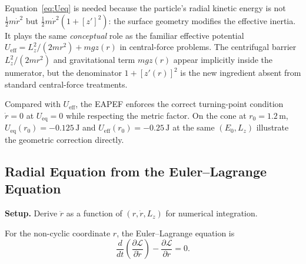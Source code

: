 \documentclass[11pt,letterpaper]{article}
\newcommand{\parhead}[1]{\par\medskip\noindent\textbf{#1}\ignorespaces}
\begin{document}
\begin{summarybox}
Equation~\eqref{eq:Ueq} is needed because the particle's radial kinetic energy is not $\tfrac{1}{2}m\dot{r}^2$ but $\tfrac{1}{2}m\dot{r}^2(1+[z']^2)$: the surface geometry modifies the effective inertia. It plays the same \emph{conceptual} role as the familiar effective potential $U_{\mathrm{eff}}=L_z^2/(2mr^2)+mgz(r)$ in central-force problems. The centrifugal barrier $L_z^2/(2mr^2)$ and gravitational term $mgz(r)$ appear implicitly inside the numerator, but the denominator $1+[z'(r)]^2$ is the new ingredient absent from standard central-force treatments.

Compared with $U_{\mathrm{eff}}$, the EAPEF enforces the correct turning-point condition $\dot{r}=0$ at $U_{\mathrm{eq}}=0$ while respecting the metric factor. On the cone at $r_0=1.2\,\mathrm{m}$, $U_{\mathrm{eq}}(r_0)=-0.125\,\mathrm{J}$ and $U_{\mathrm{eff}}(r_0)=-0.25\,\mathrm{J}$ at the same $(E_0,L_z)$ illustrate the geometric correction directly.
\end{summarybox}

\subsection{Radial Equation from the Euler--Lagrange Equation}
\label{sec:EL}

\parhead{Setup.}
Derive $\ddot{r}$ as a function of $(r,\dot{r},L_z)$ for numerical integration.

For the non-cyclic coordinate $r$, the Euler--Lagrange equation is
\begin{equation}\label{eq:EL}
    \frac{d}{dt}\left(\frac{\partial\mathcal{L}}{\partial\dot{r}}\right)
    - \frac{\partial\mathcal{L}}{\partial r} = 0.
\end{equation}
\end{document}
